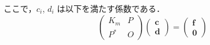 \begin{theorem}
\begin{equation}
    \end{equation}
    ここで，$c_i$, $d_i$ は以下を満たす係数である．
    \begin{equation}
        \begin{pmatrix}
            K_m & P \\
            P^* & O
        \end{pmatrix}
        \begin{pmatrix}
            \bm{c} \\ \bm{d}
        \end{pmatrix}
        =
        \begin{pmatrix}
            \bm{f} \\ \bm{0}
        \end{pmatrix}
        \label{eq:interp_kernel_rkhs_exact-interp-with-additional-terms-coeff-equation}
    \end{equation}
\end{theorem}
